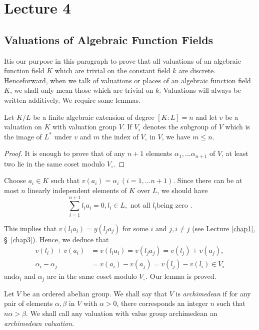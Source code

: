 
\chapter{Lecture 4}\label{chap4}

\setcounter{section}{5}
\section{Valuations of Algebraic Function Fields}\label{chap4:sec6}

It\pageoriginale is our purpose in this paragraph to prove that all valuations of an
algebraic function field $K$ which are trivial on the constant field
$k$ are discrete. Henceforward, when we talk of valuations or places
of an algebraic function field $K$, we shall only mean those which are
trivial on $k$. Valuations will always be written additively. We
require some lemmas. 

\begin{Lemma}\label{chap4:sec6:lem1}%
  Let $K/L$ be a finite algebraic extension of degree $[K : L]=n$ and
  let $v$ be a valuation on $K$ with valuation group $V$. If $V_\circ$
  denotes the subgroup of $V$ which is the image of $L^*$ under $v$ and
  $m$ the index of $V_\circ$ in $V$, we have $m \leq n$. 
\end{Lemma}

\begin{proof}
  It is enough to prove that of any $n+1$ elements $\alpha_1, \ldots
  \alpha_{n+1}$ of $V$, at least two lie in the same coset modulo
  $V_\circ$. 
\end{proof}

Choose $a_i \in K$ such that $v(a_i) = \alpha_i \,(i=1, \ldots
n+1)$. Since there can be at most $n$ linearly independent elements of
$K$ over $L$, we should have 
$$
\sum^{n+1}_{i=1} l_i a_i = 0, l_i \in L, \text{ not all } l_i \text{
  being zero }. 
$$

This implies that $v(l_i a_i) = y(l_j a_j)$ for some $i$ and $j, i
\neq j $ (see Lecture \ref{chap1}, \S\ \ref{chap3}). Hence, we deduce that 
\begin{align*}
  v(l_i) + v(a_i) & = v(l_i a_i) = v(l_j a_j) = v(l_j) + v(a_j),\\
  \alpha_i - \alpha_j & = v(a_i) -v(a_j) = v(l_j) -v(l_i) \in
  V_\circ 
\end{align*}
and\pageoriginale $\alpha_i$ and $\alpha_j$ are in the same coset modulo
$V_\circ$. Our lemma is proved. 

Let $V$ be an ordered abelian group. We shall say that $V$ is
\textit{archime\-dean} if for any pair of elements $\alpha, \beta$ in
$V$ with $\alpha > 0$, there corresponds an integer $n$ such that $n
\alpha > \beta$. We shall call any valuation with value group
archimedean an \textit{archimedean valuation}. 

